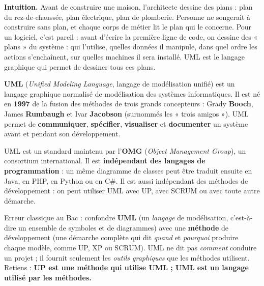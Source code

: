 \documentclass[11pt]{article}
\newcommand{\cle}[1]{{\popxbold\color{popdark}#1}}
\newcounter{popsec}
\newcounter{popsub}
\newcommand{\courssub}[1]{%
  \stepcounter{popsub}%
  \par\vspace{9pt}\noindent{\popxbold\fontsize{11.5}{13}\selectfont\color{popink}{\color{poporange}\thepopsec.\thepopsub}\hspace{6pt}#1}\par\nopagebreak\vspace{4pt}
}
\begin{document}
\courssub{Qu'est-ce qu'UML ?}

\textbf{Intuition.} Avant de construire une maison, l'architecte dessine des plans : plan du rez-de-chaussée, plan électrique, plan de plomberie. Personne ne songerait à construire sans plan, et chaque corps de métier lit le plan qui le concerne. Pour un logiciel, c'est pareil : avant d'écrire la première ligne de code, on dessine des « plans » du système : qui l'utilise, quelles données il manipule, dans quel ordre les actions s'enchaînent, sur quelles machines il sera installé. UML est le langage graphique qui permet de dessiner tous ces plans.

\begin{definition}[UML]
\textbf{UML} (\emph{Unified Modeling Language}, langage de modélisation unifié) est un \cle{langage graphique normalisé} de modélisation des systèmes informatiques. Il est né en \textbf{1997} de la fusion des méthodes de trois grands concepteurs : Grady \textbf{Booch}, James \textbf{Rumbaugh} et Ivar \textbf{Jacobson} (surnommés les « trois amigos »). UML permet de \textbf{communiquer}, \textbf{spécifier}, \textbf{visualiser} et \textbf{documenter} un système avant et pendant son développement.
\end{definition}

\begin{propriete}
UML est un \cle{standard} maintenu par l'\textbf{OMG} (\emph{Object Management Group}), un consortium international. Il est \textbf{indépendant des langages de programmation} : un même diagramme de classes peut être traduit ensuite en Java, en PHP, en Python ou en C\#. Il est aussi indépendant des méthodes de développement : on peut utiliser UML avec UP, avec SCRUM ou avec toute autre démarche.
\end{propriete}

\begin{attention}
Erreur classique au Bac : confondre \textbf{UML} (un \emph{langage} de modélisation, c'est-à-dire un ensemble de symboles et de diagrammes) avec une \textbf{méthode} de développement (une démarche complète qui dit \emph{quand} et \emph{pourquoi} produire chaque modèle, comme UP, XP ou SCRUM). UML ne dit pas \emph{comment} conduire un projet ; il fournit seulement les \emph{outils graphiques} que les méthodes utilisent. Retiens : \textbf{UP est une méthode qui utilise UML ; UML est un langage utilisé par les méthodes.}
\end{attention}
\end{document}
